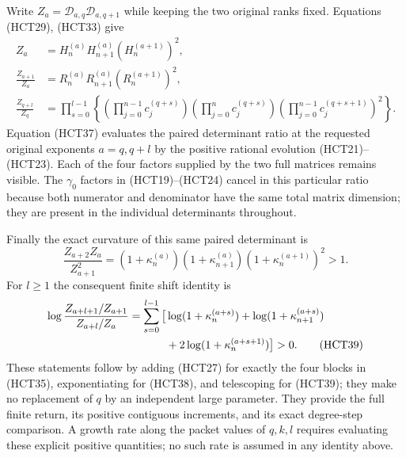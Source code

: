 Write $Z_a=\mathcal D_{a,q}\mathcal D_{a,q+1}$ while keeping
the two original ranks fixed. Equations (HCT29), (HCT33) give
\begin{align}
 Z_a&=H_n^{(a)}H_{n+1}^{(a)}(H_n^{(a+1)})^2,\tag{HCT35}\\
 \frac{Z_{a+1}}{Z_a}
 &=R_n^{(a)}R_{n+1}^{(a)}(R_n^{(a+1)})^2,\tag{HCT36}\\
 \frac{Z_{q+l}}{Z_q}
 &=\prod_{s=0}^{l-1}
 \left\{
 \left(\prod_{j=0}^{n-1}c_j^{(q+s)}\right)
 \left(\prod_{j=0}^{n}c_j^{(q+s)}\right)
 \left(\prod_{j=0}^{n-1}c_j^{(q+s+1)}\right)^2
 \right\}.\tag{HCT37}
\end{align}
Equation (HCT37) evaluates the paired determinant ratio at the
requested original exponents $a=q,q+l$ by the positive rational
evolution (HCT21)--(HCT23). Each of the four factors supplied by
the two full matrices remains visible. The $\gamma_0$ factors
in (HCT19)--(HCT24) cancel in this particular ratio because both
numerator and denominator have the same total matrix dimension;
they are present in the individual determinants throughout.

Finally the exact curvature of this same paired determinant is
\begin{equation}\tag{HCT38}
 \frac{Z_{a+2}Z_a}{Z_{a+1}^2}
 =(1+\kappa_n^{(a)})(1+\kappa_{n+1}^{(a)})
  (1+\kappa_n^{(a+1)})^2>1.
\end{equation}
For $l\geq1$ the consequent finite shift identity is
\begin{align}
 \log\frac{Z_{a+l+1}/Z_{a+1}}{Z_{a+l}/Z_a}
 =\sum_{s=0}^{l-1}\big[&\log(1+\kappa_n^{(a+s)})
 +\log(1+\kappa_{n+1}^{(a+s)})\notag\\
 &+2\log(1+\kappa_n^{(a+s+1)})\big]>0.\tag{HCT39}
\end{align}
These statements follow by adding (HCT27) for exactly the four
blocks in (HCT35), exponentiating for (HCT38), and telescoping
for (HCT39); they make no replacement of $q$ by an
independent large parameter. They provide the full finite return,
its positive contiguous increments, and its exact degree-step
comparison. A growth rate along the packet values of $q,k,l$
requires evaluating these explicit positive quantities; no such
rate is assumed in any identity above.
